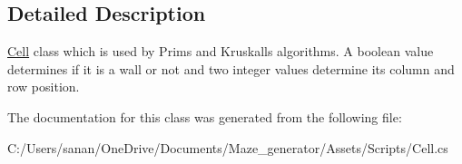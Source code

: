 \subsection{Detailed Description}
\mbox{\hyperlink{class_cell}{Cell}} class which is used by Prim\textquotesingle{}s and Kruskall\textquotesingle{}s algorithms. A boolean value determines if it is a wall or not and two integer values determine its column and row position. 

The documentation for this class was generated from the following file\+:\begin{DoxyCompactItemize}
\item 
C\+:/\+Users/sanan/\+One\+Drive/\+Documents/\+Maze\+\_\+generator/\+Assets/\+Scripts/Cell.\+cs\end{DoxyCompactItemize}
